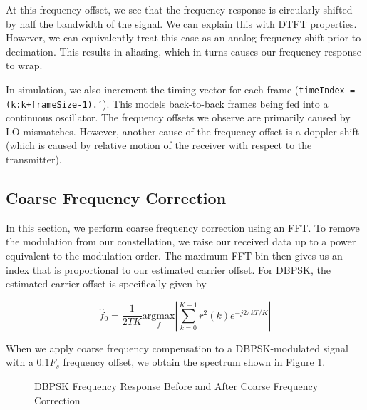 \documentclass{article}
\begin{document}
\noindent At this frequency offset, we see that the frequency response is circularly shifted by half the bandwidth of the signal. We can explain this with DTFT properties. However, we can equivalently treat this case as an analog frequency shift prior to decimation. This results in aliasing, which in turns causes our frequency response to wrap.

	In simulation, we also increment the timing vector for each frame (\texttt{timeIndex = (k:k+frameSize-1).'}). This models back-to-back frames being fed into a continuous oscillator. The frequency offsets we observe are primarily caused by LO mismatches. However, another cause of the frequency offset is a doppler shift (which is caused by relative motion of the receiver with respect to the transmitter).

\subsection{Coarse Frequency Correction}

In this section, we perform coarse frequency correction using an FFT. To remove the modulation from our constellation, we raise our received data up to a power equivalent to the modulation order. The maximum FFT bin then gives us an index that is proportional to our estimated carrier offset. For DBPSK, the estimated carrier offset is specifically given by

\begin{equation}
	\hat{f}_0 = \frac{1}{2TK}\underset{f}{\text{argmax}}\left\vert\sum_{k=0}^{K-1}{r^2(k)e^{-j2{\pi}kT/K}}\right\vert
\end{equation}
	
\noindent When we apply coarse frequency compensation to a DBPSK-modulated signal with a $0.1F_s$ frequency offset, we obtain the spectrum shown in Figure \ref{fig::psd_bpsk_with_cfc}.

\begin{figure}[H]
	\centerline{}
	\caption{DBPSK Frequency Response Before and After Coarse Frequency Correction}
	\label{fig::psd_bpsk_with_cfc}
\end{figure}
\end{document}
